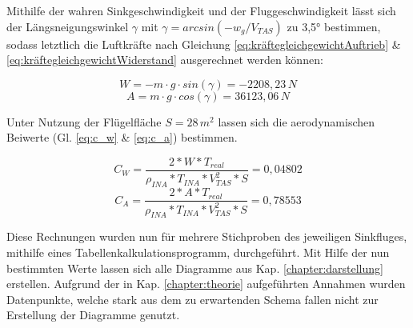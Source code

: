 \noindent Mithilfe der wahren Sinkgeschwindigkeit und der Fluggeschwindigkeit lässt sich der Längsneigungswinkel $\gamma$ mit $\gamma = arcsin(-w_g/V_{TAS})$ zu 3,5° bestimmen, sodass letztlich die Luftkräfte nach Gleichung \ref{eq:kräftegleichgewichtAuftrieb} \& \ref{eq:kräftegleichgewichtWiderstand} ausgerechnet werden können:

\begin{equation*}
W = - m\cdot g \cdot sin(\gamma) = -2208,23\,N
\end{equation*}
\begin{equation*}
A = m\cdot g \cdot cos(\gamma) = 36123,06\,N
\end{equation*}

\vspace{5mm} \noindent
Unter Nutzung der Flügelfläche $S = 28\,m^2$  lassen sich die aerodynamischen Beiwerte (Gl. \ref{eq:c_w} \& \ref{eq:c_a}) bestimmen.

\begin{equation*}
C_W = \frac{2*W*T_{real}}{\rho_{INA} * T_{INA} * V_{TAS}^2 * S} = 0,04802
\end{equation*}
\begin{equation*}
C_A = \frac{2*A*T_{real}}{\rho_{INA} * T_{INA} * V_{TAS}^2 * S} = 0,78553
\end{equation*}

\vspace{5mm} 

\noindent 
Diese Rechnungen wurden nun für mehrere Stichproben des jeweiligen Sinkfluges, mithilfe eines Tabellenkalkulationsprogramm, durchgeführt. Mit Hilfe der nun bestimmten Werte lassen sich alle Diagramme aus Kap. \ref{chapter:darstellung} erstellen. Aufgrund der in Kap. \ref{chapter:theorie} aufgeführten Annahmen wurden Datenpunkte, welche stark aus dem zu erwartenden Schema fallen nicht zur Erstellung der Diagramme genutzt. 

\newpage